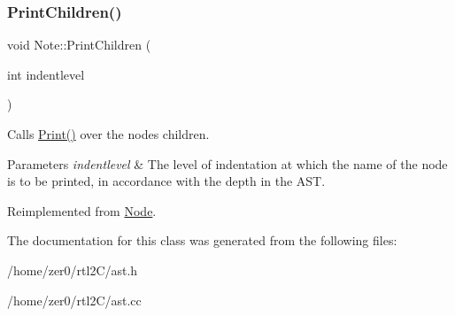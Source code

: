 \subsubsection{\texorpdfstring{Print\+Children()}{PrintChildren()}}
{\footnotesize\ttfamily void Note\+::\+Print\+Children (\begin{DoxyParamCaption}\item[{int}]{indentlevel }\end{DoxyParamCaption})\hspace{0.3cm}{\ttfamily [virtual]}}

Calls \hyperlink{class_node_a9ef727fd72d1a37792b3db60a8a479dd}{Print()} over the node\textquotesingle{}s children. 
\begin{DoxyParams}{Parameters}
{\em indentlevel} & The level of indentation at which the name of the node is to be printed, in accordance with the depth in the A\+ST. \\
\hline
\end{DoxyParams}


Reimplemented from \hyperlink{class_node_a3e67ec8d22182b721717af14fe0c3000}{Node}.



The documentation for this class was generated from the following files\+:\begin{DoxyCompactItemize}
\item 
/home/zer0/rtl2\+C/ast.\+h\item 
/home/zer0/rtl2\+C/ast.\+cc\end{DoxyCompactItemize}
